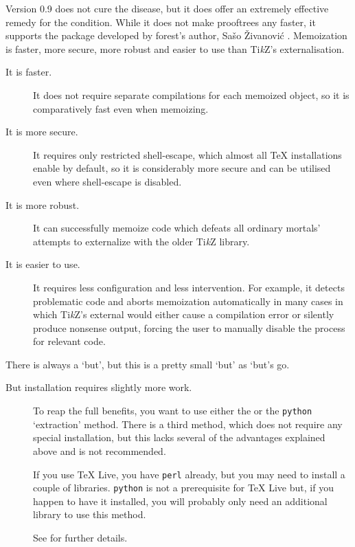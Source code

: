 \documentclass[10pt,british,a4paper,doc2]{ltxdoc}
\newcommand*\pkg[1]{\textsf{#1}}
\newcommand*\TikZ{Ti\emph{k}Z}
\begin{document}
Version 0.9 does not cure the disease, but it does offer an extremely effective remedy for the condition.
While it does not make \pkg{prooftrees} any faster, it supports the \keyname[pkg]{\pkg{memoize}} package developed by \pkg{forest}'s author, Sašo Živanović \autocite*{saso-memoize-manual}.
Memoization is faster, more secure, more robust and easier to use than \TikZ's externalisation.
\begin{description}
  \item[It is faster.] It does not require separate compilations for each memoized object, so it is comparatively fast even when memoizing.
  \item[It is more secure.] It requires only restricted shell-escape, which almost all \TeX{} installations enable by default, so it is considerably more secure and can be utilised even where shell-escape is disabled.
  \item[It is more robust.] It can successfully memoize code which defeats all ordinary mortals' attempts to externalize with the older \TikZ{} library.
  \item[It is easier to use.] It requires less configuration and less intervention.
  For example, it detects problematic code and aborts memoization automatically in many cases in which \TikZ's \pkg{external} would either cause a compilation error or silently produce nonsense output, forcing the user to manually disable the process for relevant code.
\end{description}

There is always a ‘but’, but this is a pretty small ‘but’ as ‘but’s go.
\begin{description}
  \item[But installation requires slightly more work.] To reap the full benefits, you want to use either the  or the \texttt{python} ‘extraction’ method.
  There is a third method, which does not require any special installation, but this lacks several of the advantages explained above and is not recommended.
  
  If you use \TeX{} Live, you have \texttt{perl} already, but you may need to install a couple of libraries.
  \texttt{python} is not a prerequisite for \TeX{} Live but, if you happen to have it installed, you will probably only need an additional library to use this method.

  See  \autocite{saso-memoize-manual} for further details.
\end{description}
\end{document}
